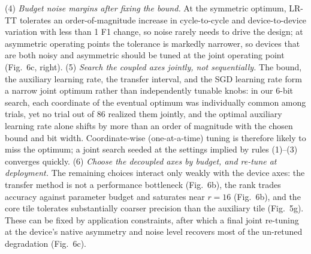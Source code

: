\documentclass[fleqn,10pt]{wlscirep}
\begin{document}
(4) \emph{Budget noise margins after fixing the bound.} At the symmetric optimum, LR-TT tolerates an order-of-magnitude increase in cycle-to-cycle and device-to-device variation with less than 1 F1 change, so noise rarely needs to drive the design; at asymmetric operating points the tolerance is markedly narrower, so devices that are both noisy and asymmetric should be tuned at the joint operating point (Fig.~6c, right).
(5) \emph{Search the coupled axes jointly, not sequentially.} The bound, the auxiliary learning rate, the transfer interval, and the SGD learning rate form a narrow joint optimum rather than independently tunable knobs: in our 6-bit search, each coordinate of the eventual optimum was individually common among trials, yet no trial out of 86 realized them jointly, and the optimal auxiliary learning rate alone shifts by more than an order of magnitude with the chosen bound and bit width. Coordinate-wise (one-at-a-time) tuning is therefore likely to miss the optimum; a joint search seeded at the settings implied by rules (1)--(3) converges quickly.
(6) \emph{Choose the decoupled axes by budget, and re-tune at deployment.} The remaining choices interact only weakly with the device axes: the transfer method is not a performance bottleneck (Fig.~6b), the rank trades accuracy against parameter budget and saturates near \(r=16\) (Fig.~6b), and the core tile tolerates substantially coarser precision than the auxiliary tile (Fig.~5g). These can be fixed by application constraints, after which a final joint re-tuning at the device's native asymmetry and noise level recovers most of the un-retuned degradation (Fig.~6c).
\clearpage
\end{document}
